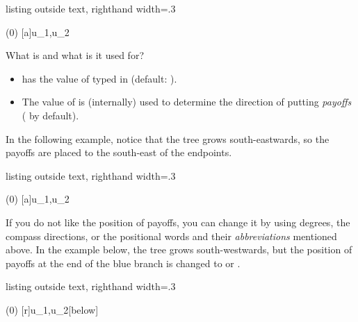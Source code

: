 \begin{tcblisting}{listing outside text, righthand width=.3\linewidth}
\begin{istgame}
\istroot(0)
  \istb[draw=blue,thick]{\beta}[a]{u_1,u_2}
  \endist
\end{istgame}
\end{tcblisting}

\remark What is \icmd{\istgrowdirection} and what is it used for?
\begin{itemize}
\item \cmd{\istgrowdirection} has the value of  typed in \cmd{\istroot} (default: ).
\item The value of \cmd{\istgrowdirection} is (internally) used to determine the direction of putting \emph{payoffs} ( by default).
\end{itemize}


In the following example, notice that the tree grows south-eastwards, so the payoffs are placed to the south-east of the endpoints.

\begin{tcblisting}{listing outside text, righthand width=.3\linewidth}
\begin{istgame}
\istroot[-45](0)
  \istb[draw=blue,thick]{\beta}[a]{u_1,u_2}
  \endist
\end{istgame}
\end{tcblisting}

If you do not like the position of payoffs, you can change it by using degrees, the compass directions, or the positional words and their \emph{abbreviations} mentioned above.
In the example below, the tree grows south-westwards, but the position of payoffs at the end of the blue branch is changed to \xw{[below]} or \xw{[b]}.

\begin{tcblisting}{listing outside text, righthand width=.3\linewidth}
\begin{istgame}
(0)
  \istb[draw=blue,thick]{\beta}[r]{u_1,u_2}[below]
  \endist
\end{istgame}
\end{tcblisting}

